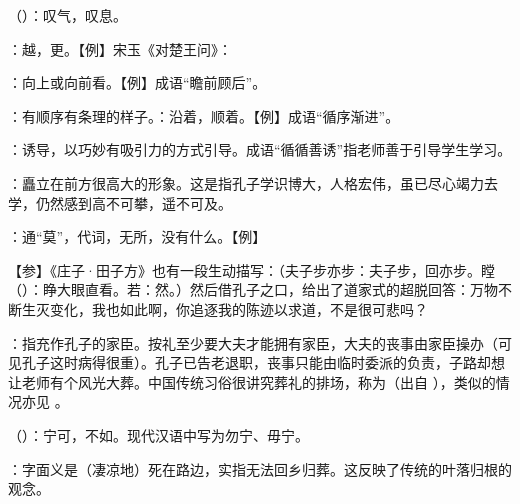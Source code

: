 {
\begin{lyitemize}
\item {}（）：叹气，叹息。
\item {}：越，更。【例】宋玉《对楚王问》：
\item {}：向上或向前看。【例】成语“瞻前顾后”。
\item {}：有顺序有条理的样子。：沿着，顺着。【例】成语“循序渐进”。

：诱导，以巧妙有吸引力的方式引导。成语“循循善诱”指老师善于引导学生学习。
\item {}：矗立在前方很高大的形象。这是指孔子学识博大，人格宏伟，虽已尽心竭力去学，仍然感到高不可攀，遥不可及。

\item {}：通“莫”，代词，无所，没有什么。【例】 
\end{lyitemize}
【参】《庄子·田子方》也有一段生动描写：（夫子步亦步：夫子步，回亦步。瞠（）：睁大眼直看。若：然。）然后借孔子之口，给出了道家式的超脱回答：万物不断生灭变化，我也如此啊，你追逐我的陈迹以求道，不是很可悲吗？} %
{}


{
\item {}：指充作孔子的家臣。按礼至少要大夫才能拥有家臣，大夫的丧事由家臣操办（可见孔子这时病得很重）。孔子已告老退职，丧事只能由临时委派的负责，子路却想让老师有个风光大葬。中国传统习俗很讲究葬礼的排场，称为（出自 ），类似的情况亦见  。
\item {}（）：宁可，不如。现代汉语中写为勿宁、毋宁。

\item {}：字面义是（凄凉地）死在路边，实指无法回乡归葬。这反映了传统的叶落归根的观念。
}
{}



